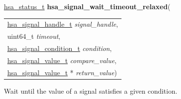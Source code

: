 \documentclass[final]{book}
\newcommand{\hsaarg}[1]{\textit{#1}}
\begin{document}
\noindent\begin{tcolorbox}[breakable,nobeforeafter,colframe=white,colback=lightgray,left=0mm]
\hyperlink{group__status_1gad755322e7ff95456520e8abdbe90d225}{hsa_status_t} \hypertarget{group__signals_1gaed306c1c7a65c2681cc9a42825a548ad}{\textbf{hsa_signal_wait_timeout_relaxed}}(
\vspace{-3.5mm}\begin{longtable}{@{}p{\textwidth}}
\hspace{1.7em}\hyperlink{group__signals_1ga6592c136d70853d855bc11d9efdbf534}{hsa_signal_handle_t} \hsaarg{signal_handle},\\
\hspace{1.7em}uint64_t \hsaarg{timeout},\\
\hspace{1.7em}\hyperlink{group__signals_1gab7190fcff48c6dbeded341389ed17c8d}{hsa_signal_condition_t} \hsaarg{condition},\\
\hspace{1.7em}\hyperlink{group__signals_1gacdf7a070a2f988bcf97904a1f5d0e573}{hsa_signal_value_t} \hsaarg{compare_value},\\
\hspace{1.7em}\hyperlink{group__signals_1gacdf7a070a2f988bcf97904a1f5d0e573}{hsa_signal_value_t} * \hsaarg{return_value})\end{longtable}

\end{tcolorbox}
Wait until the value of a signal satisfies a given condition.
\end{document}
